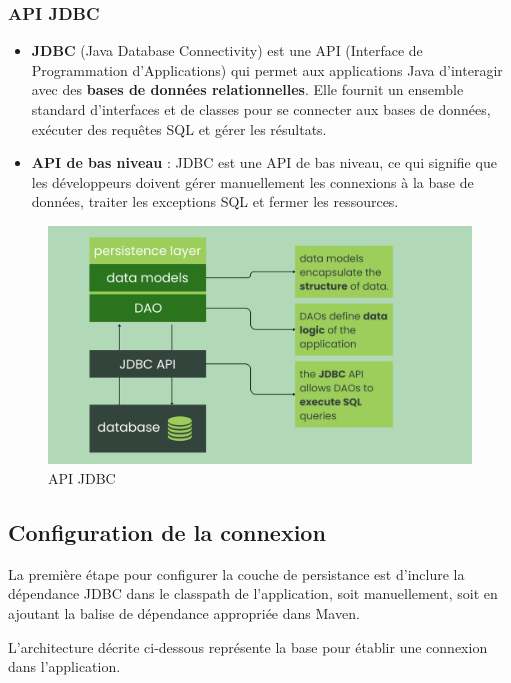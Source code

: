 \documentclass{article}
\begin{document}
\subsubsection{API JDBC}

\begin{itemize}
    \item \textbf{JDBC} (Java Database Connectivity) est une API (Interface de Programmation d'Applications) qui permet aux applications Java d'interagir avec des \textbf{bases de données relationnelles}. Elle fournit un ensemble standard d'interfaces et de classes pour se connecter aux bases de données, exécuter des requêtes SQL et gérer les résultats.

    \item \textbf{API de bas niveau} : JDBC est une API de bas niveau, ce qui signifie que les développeurs doivent gérer manuellement les connexions à la base de données, traiter les exceptions SQL et fermer les ressources.
\end{itemize}

\begin{figure}[H]
    \centering
    \begin{framed}
        \includegraphics[width=0.8\linewidth]{images/persistence_jdbc.png}
    \end{framed}
    \caption{API JDBC}
    \label{fig:spring-logo}
\end{figure}

\subsection{Configuration de la connexion}

La première étape pour configurer la couche de persistance est d'inclure la dépendance JDBC dans le classpath de l'application, soit manuellement, soit en ajoutant la balise de dépendance appropriée dans Maven. 

L'architecture décrite ci-dessous représente la base pour établir une connexion dans l'application.
\end{document}
